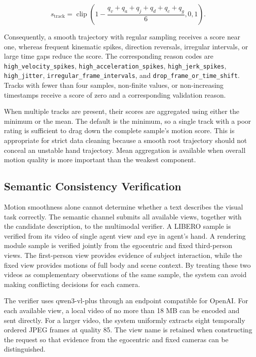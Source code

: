 \documentclass[11pt,oneside]{report}
\begin{document}
\[
s_{\text{track}} =
\operatorname{clip}\!\left(
1-\frac{q_v+q_a+q_j+q_d+q_c+q_g}{6},
0,1
\right).
\]

Consequently, a smooth trajectory with regular sampling receives a score near one, whereas frequent kinematic spikes, direction reversals, irregular intervals, or large time gaps reduce the score. The corresponding reason codes are \texttt{high\_velocity\_spikes},
\texttt{high\_acceleration\_spikes},
\texttt{high\_jerk\_spikes},
\texttt{high\_jitter},
\texttt{irregular\_frame\_intervals}, and
\texttt{drop\_frame\_or\_time\_shift}. Tracks with fewer than four samples, non-finite values, or non-increasing timestamps receive a score of zero and a corresponding validation reason.

When multiple tracks are present, their scores are aggregated using either the minimum or the mean. The default is the minimum, so a single track with a poor rating is sufficient to drag down the complete sample's motion score. This is appropriate for strict data cleaning because a smooth root trajectory should not conceal an unstable hand trajectory. Mean aggregation is available when overall motion quality is more important than the weakest component.
\subsection{Semantic Consistency Verification}

Motion smoothness alone cannot determine whether a text describes the visual task correctly. The semantic channel submits all available views, together with the candidate description, to the multimodal verifier. A LIBERO sample is verified from its video of single agent view and eye in agent’s hand. A rendering module sample is verified jointly from the egocentric and fixed third-person views. The first-person view provides evidence of subject interaction, while the fixed view provides motions of full body and scene context. By treating these two videos as complementary observations of the same sample, the system can avoid making conflicting decisions for each camera.

The verifier uses qwen3-vl-plus through an endpoint compatible for OpenAI. For each available view, a local video of no more than 18 MB can be encoded and sent directly. For a larger video, the system uniformly extracts eight temporally ordered JPEG frames at quality 85. The view name is retained when constructing the request so that evidence from the egocentric and fixed cameras can be distinguished.
\end{document}
